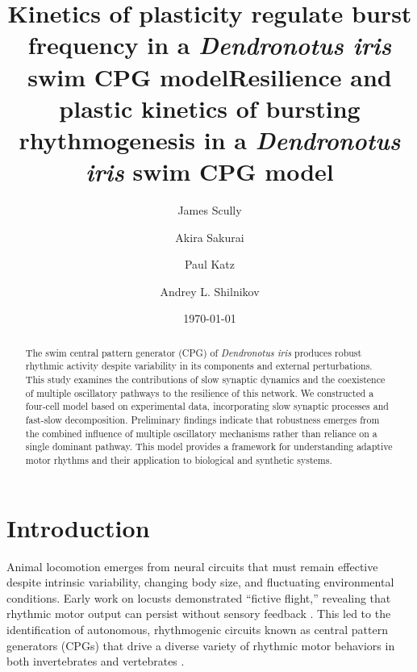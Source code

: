 \documentclass[nofootinbib,aip,amsmath,amssymb,reprint,twocolumn,10pt]{revtex4-2}
\begin{document}
\title{Kinetics of plasticity regulate burst frequency in a {\em \textit{Dendronotus iris}} swim CPG model}
\title{Resilience and plastic kinetics of bursting rhythmogenesis in a {\em \textit{Dendronotus iris}} swim CPG model}


\author{James Scully}
\author{Akira Sakurai}
\author{Paul Katz}
\author{Andrey L. Shilnikov}


\date{\today}
\begin{abstract}

The swim central pattern generator (CPG) of {\em \textit{Dendronotus iris}} produces robust rhythmic activity despite variability in its components and external perturbations.
This study examines the contributions of slow synaptic dynamics and the coexistence of multiple oscillatory pathways to the resilience of this network.
We constructed a four-cell model based on experimental data, incorporating slow synaptic processes and fast-slow decomposition.
Preliminary findings indicate that robustness emerges from the combined influence of multiple oscillatory mechanisms rather than reliance on a single dominant pathway.
This model provides a framework for understanding adaptive motor rhythms and their application to biological and synthetic systems.
\end{abstract}

\maketitle
\section{Introduction}
Animal locomotion emerges from neural circuits that must remain effective despite intrinsic variability, changing body size, and fluctuating environmental conditions.
Early work on locusts demonstrated ``fictive flight,'' revealing that rhythmic motor output can persist without sensory feedback \cite{Wilson1961}.
This led to the identification of autonomous, rhythmogenic circuits known as central pattern generators (CPGs) that drive a diverse variety of rhythmic motor behaviors in both invertebrates and vertebrates \cite{MarderCalabrese1996, Kiehn2006}.
\end{document}
